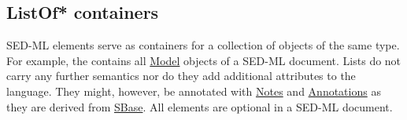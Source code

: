 \subsection{ListOf* containers}
\label{listOfElements}
SED-ML  elements serve as containers  for a collection of objects of the same type. For example, the  contains all \hyperref[class:model]{Model} objects of a SED-ML document. Lists do not carry any further semantics nor do they add additional attributes to the language. They might, however, be annotated with \hyperref[class:notes]{Notes} and \hyperref[class:annotation]{Annotations} as they are derived from \hyperref[class:sbase]{SBase}.
All  elements are optional in a SED-ML document. 

  

  

  

  

  

  
  
  

 

 


